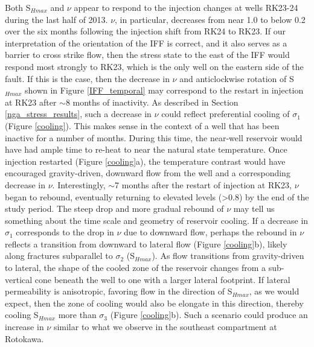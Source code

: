 Both S$_{Hmax}$ and $\nu$ appear to respond to the injection changes at wells RK23-24 during the last half of 2013. $\nu$, in particular, decreases from near 1.0 to below 0.2 over the six months following the injection shift from RK24 to RK23. If our interpretation of the orientation of the \acrlong{IFF} is correct, and it also serves as a barrier to cross strike flow, then the stress state to the east of the \acrshort{IFF} would respond most strongly to RK23, which is the only well on the eastern side of the fault. If this is the case, then the decrease in $\nu$ and anticlockwise rotation of S$_{Hmax}$ shown in Figure \ref{IFF_temporal} may correspond to the restart in injection at RK23 after $\sim$8 months of inactivity. As described in Section \ref{nga_stress_results}, such a decrease in $\nu$ could reflect preferential cooling of $\sigma_{1}$ (Figure \ref{cooling}). This makes sense in the context of a well that has been inactive for a number of months. During this time, the near-well reservoir would have had ample time to re-heat to near the natural state temperature. Once injection restarted (Figure \ref{cooling}a), the temperature contrast would have encouraged gravity-driven, downward flow from the well and a corresponding decrease in $\nu$. Interestingly, $\sim$7 months after the restart of injection at RK23, $\nu$ began to rebound, eventually returning to elevated levels (\textgreater{0.8}) by the end of the study period. The steep drop and more gradual rebound of $\nu$ may tell us something about the time scale and geometry of reservoir cooling. If a decrease in $\sigma_{1}$ corresponds to the drop in $\nu$ due to downward flow, perhaps the rebound in $\nu$ reflects a transition from downward to lateral flow (Figure \ref{cooling}b), likely along fractures subparallel to $\sigma_{2}$ (S$_{Hmax}$). As flow transitions from gravity-driven to lateral, the shape of the cooled zone of the reservoir changes from a sub-vertical cone beneath the well to one with a larger lateral footprint. If lateral \gls{permeability} is anisotropic, favoring flow in the direction of S$_{Hmax}$, as we would expect, then the zone of cooling would also be elongate in this direction, thereby cooling S$_{Hmax}$ more than $\sigma_{3}$ (Figure \ref{cooling}b). Such a scenario could produce an increase in $\nu$ similar to what we observe in the southeast compartment at Rotokawa.

